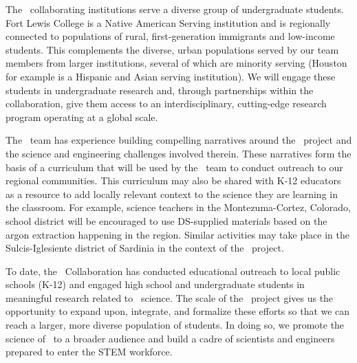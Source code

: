 The \DS\ collaborating institutions serve a diverse group of undergraduate students. Fort Lewis College is a Native American Serving institution and is regionally connected to populations of rural, first-generation immigrants and low-income students. This complements the diverse, urban populations served by our team members from larger institutions, several of which are minority serving (Houston for example is a Hispanic and Asian serving institution). We will engage these students in undergraduate research and, through partnerships within the collaboration, give them access to an interdisciplinary, cutting-edge research program operating at a global scale.

The \DS\ team has experience building compelling narratives around the \DS\ project and the science and engineering challenges involved therein.  These narratives form the basis of a curriculum that will be used by the \DS\ team to conduct outreach to our regional communities. This curriculum may also be shared with K-12 educators as a resource to add locally relevant context to the science they are learning in the classroom.  For example, science teachers in the Montezuma-Cortez, Colorado, school district will be encouraged to use DS-supplied materials based on the argon extraction happening in the region.  Similar activities may take place in the Sulcis-Iglesiente district of Sardinia in the context of the \Aria\ project. 

To date, the \DS\ Collaboration has conducted educational outreach to local public schools (K-12) and engaged high school and undergraduate students in meaningful research related to \DS\ science.  The scale of the \DSks\ project gives us the opportunity to expand upon, integrate, and formalize these efforts so that we can reach a larger, more diverse population of students.  In doing so, we promote the science of \DS\ to a broader audience and build a cadre of scientists and engineers prepared to enter the STEM workforce.